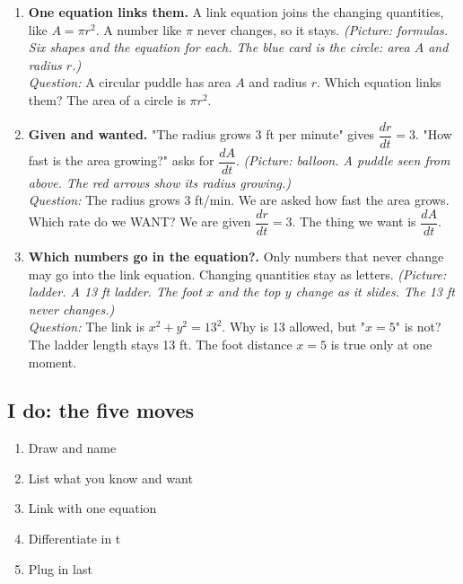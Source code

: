 \documentclass[11pt]{article}
\begin{document}
\begin{enumerate}
\item \textbf{One equation links them.} A link equation joins the changing quantities, like $A=\pi r^2$. A number like $\pi$ never changes, so it stays. \textit{(Picture: formulas. Six shapes and the equation for each. The blue card is the circle: area $A$ and radius $r$.)}\\ \textit{Question:} A circular puddle has area $A$ and radius $r$. Which equation links them?  The area of a circle is $\pi r^2$.
\item \textbf{Given and wanted.} "The radius grows 3 ft per minute" gives $\dfrac{dr}{dt}=3$. "How fast is the area growing?" asks for $\dfrac{dA}{dt}$. \textit{(Picture: balloon. A puddle seen from above. The red arrows show its radius growing.)}\\ \textit{Question:} The radius grows 3 ft/min. We are asked how fast the area grows. Which rate do we WANT?  We are given $\dfrac{dr}{dt}=3$. The thing we want is $\dfrac{dA}{dt}$.
\item \textbf{Which numbers go in the equation?.} Only numbers that never change may go into the link equation. Changing quantities stay as letters. \textit{(Picture: ladder. A 13 ft ladder. The foot $x$ and the top $y$ change as it slides. The 13 ft never changes.)}\\ \textit{Question:} The link is $x^2+y^2=13^2$. Why is 13 allowed, but "$x=5$" is not?  The ladder length stays 13 ft. The foot distance $x=5$ is true only at one moment.
\end{enumerate}
\subsection*{I do: the five moves}\begin{enumerate}\item Draw and name
\item List what you know and want
\item Link with one equation
\item Differentiate in t
\item Plug in last\end{enumerate}
\end{document}
